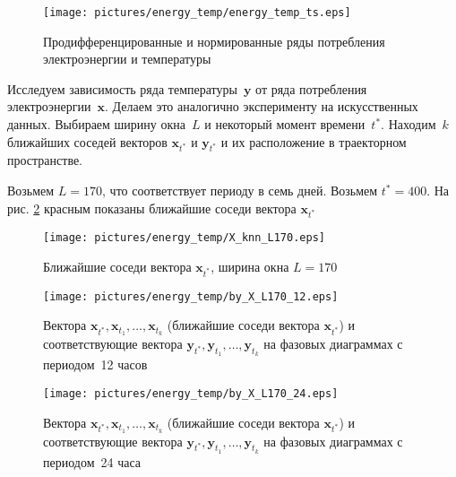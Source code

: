 \documentclass[14pt]{article}
\newcommand{\bx}{\mathbf{x}}
\newcommand{\by}{\mathbf{y}}
\begin{document}
\begin{figure}
\begin{center}
\texttt{[image: pictures/energy\_temp/energy\_temp\_ts.eps]}
\caption{Продифференцированные и нормированные ряды потребления электроэнергии и температуры}
\label{energy_temp_ts}
\end{center}
\end{figure}

Исследуем зависимость ряда температуры~$\by$ от ряда потребления электроэнергии~$\bx$. Делаем это аналогично эксперименту на искусственных данных. Выбираем ширину окна~$L$ и некоторый момент времени~$t^*$. Находим~$k$ ближайших соседей векторов $\bx_{t^*}$ и $\by_{t^*}$ и их расположение в траекторном пространстве. 

Возьмем $L = 170$, что соответствует периоду в семь дней. 
Возьмем $t^* = 400$. На рис.  \ref{X400_L170_knn} красным показаны ближайшие соседи вектора $\bx_{t^*}$
 
\begin{figure}[H]
\begin{center}
\texttt{[image: pictures/energy\_temp/X\_knn\_L170.eps]}
\vspace{-3mm}
\caption{Ближайшие соседи вектора $\bx_{t^*}$, ширина окна $L = 170$
\label{X400_L170_knn}}
\end{center}
\end{figure}


\begin{figure}[H]
\begin{center}
\texttt{[image: pictures/energy\_temp/by\_X\_L170\_12.eps]}
\vspace{-3mm}
\caption{Вектора $\bx_{t^*}, \bx_{t_1}, \ldots, \bx_{t_k}$ (ближайшие соседи вектора $\bx_{t^*}$)  и соответствующие вектора $\by_{t^*}, \by_{t_1}, \ldots, \by_{t_k}$ на фазовых диаграммах с периодом~12 часов}
\end{center}
\end{figure}

\vspace{-4mm}

\begin{figure}[H]
\begin{center}
\texttt{[image: pictures/energy\_temp/by\_X\_L170\_24.eps]}
\vspace{-3mm}
\caption{Вектора $\bx_{t^*}, \bx_{t_1}, \ldots, \bx_{t_k}$ (ближайшие соседи вектора $\bx_{t^*}$) и соответствующие вектора $\by_{t^*}, \by_{t_1}, \ldots, \by_{t_k}$ на фазовых диаграммах с периодом~24 часа}
\end{center}
\end{figure}
\end{document}
